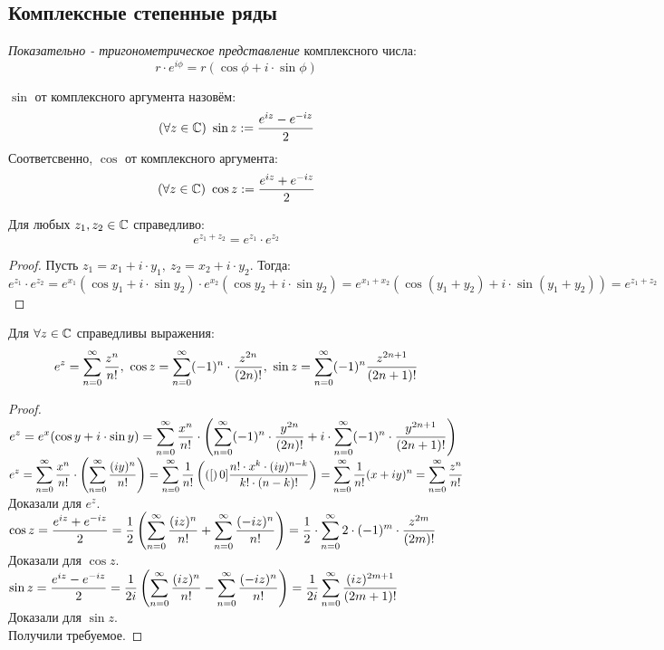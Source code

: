 \subsection{Комплексные степенные ряды}
\begin{definition}
	\textit{Показательно - тригонометрическое представление} комплексного числа:
	\[r\cdot e^{i\phi}=r(\cos\phi+i\cdot\sin\phi)\]
\end{definition}
\begin{definition}
	$\sin$ от комплексного аргумента назовём:
	\[(\forall z\in\mathbb C)\ \sin z:=\frac{e^{iz}-e^{-iz}}2\]
	Соответсвенно, $\cos$ от комплексного аргумента:
	\[(\fa z\in\C)\ \cos z:=\frac{e^{iz}+e^{-iz}}2\]
\end{definition}
\begin{lemma}
	Для любых $z_1,z_2\in\mathbb C$ справедливо:
	\[e^{z_1+z_2}=e^{z_1}\cdot e^{z_2}\]
\end{lemma}
\begin{proof}
	Пусть $z_1=x_1+i\cdot y_1,\ z_2=x_2+i\cdot y_2$. Тогда:
	\[e^{z_1}\cdot e^{z_2}=e^{x_1}(\cos y_1+i\cdot\sin y_2)\cdot e^{x_2}(\cos y_2+i\cdot\sin y_2)=e^{x_1+x_2}(\cos(y_1+y_2)+i\cdot\sin(y_1+y_2))=e^{z_1+z_2}\]
\end{proof}
\begin{theorem}\label{18_th2}
	Для $\forall z\in\mathbb C$ справедливы выражения:
	\[e^z=\ss[0]\frac{z^n}{n!},\ \cos z=\ss[0](-1)^n\cdot\frac{z^{2n}}{(2n)!},\ \sin z=\ss[0](-1)^n\frac{z^{2n+1}}{(2n+1)!}\]
\end{theorem}
\begin{proof}
	$\ds e^z=e^x(\cos y+i\cdot\sin y)=\ss[0]\frac{x^n}{n!}\cdot\l(\ss[0](-1)^n\cdot\frac{y^{2n}}{(2n)!}+i\cdot\ss[0](-1)^n\cdot\frac{y^{2n+1}}{(2n+1)!}\r)$\\
	$\ds e^z=\ss[0]\frac{x^n}{n!}\cdot\l(\ss[0]\frac{(iy)^n}{n!}\r)=\ss[0]\frac1{n!}\l(\ps[0]\frac{n!\cdot x^k\cdot(iy)^{n-k}}{k!\cdot(n-k)!}\r)=\ss[0]\frac1{n!}(x+iy)^n=\ss[0]\frac{z^n}{n!}$\\
	Доказали для $e^z$.\\
	$\ds\cos z=\frac{e^{iz}+e^{-iz}}2=\frac12\l(\ss[0]\frac{(iz)^n}{n!}+\ss[0]\frac{(-iz)^n}{n!}\r)=\frac12\cdot\ss[0]2\cdot(-1)^m\cdot\frac{z^{2m}}{(2m)!}$\\
	Доказали для $\cos z$.\\
	$\ds\sin z=\frac{e^{iz}-e^{-iz}}2=\frac1{2i}\l(\ss[0]\frac{(iz)^n}{n!}-\ss[0]\frac{(-iz)^n}{n!}\r)=\frac1{2i}\ss[0]\frac{(iz)^{2m+1}}{(2m+1)!}$\\
	Доказали для $\sin z$.\\
	Получили требуемое.
\end{proof}